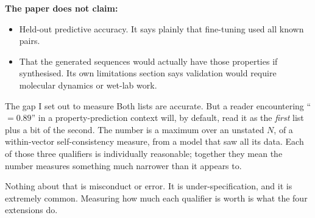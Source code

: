 \textbf{The paper does not claim:}
\begin{itemize}[leftmargin=*,itemsep=1pt]
  \item Held-out predictive accuracy. It says plainly that fine-tuning used all
        known pairs.
  \item That the generated sequences would actually have those properties if
        synthesised. Its own limitations section says validation would require
        molecular dynamics or wet-lab work.
\end{itemize}

\begin{keybox}{The gap I set out to measure}
Both lists are accurate. But a reader encountering ``\Rsq{} $= 0.89$'' in a
property-prediction context will, by default, read it as the \emph{first} list
plus a bit of the second. The number is a maximum over an unstated $N$, of a
within-vector self-consistency measure, from a model that saw all its data.
Each of those three qualifiers is individually reasonable; together they mean
the number measures something much narrower than it appears to.

Nothing about that is misconduct or error. It is under-specification, and it is
extremely common. Measuring how much each qualifier is worth is what the four
extensions do.
\end{keybox}
